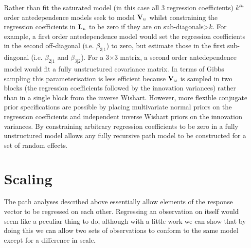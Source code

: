 \documentclass{article}
\begin{document}
Rather than fit the saturated model (in this case all 3 regression coefficients) $k^{th}$ order antedependence models seek to model ${\bf V}_{u}$ whilst constraining the regression coefficients in ${\bf L}_{u}$ to be zero if they are on sub-diagonals>$k$. For example, a first order antedependence model would set the regression coefficients in the second off-diagonal (i.e. $\beta_{3|1}$) to zero, but estimate those in the first sub-diagonal (i.e. $\beta_{2|1}$ and $\beta_{3|2}$). For a 3$\times$3 matrix, a second order antedependence model would fit a fully unstructured covariance matrix. In terms of Gibbs sampling this parameterisation is less efficient because ${\bf V}_{u}$ is sampled in two blocks (the regression coefficients followed by the innovation variances) rather than in a single block from the inverse Wishart. However, more flexible conjugate prior specifications are possible by placing multivariate normal priors on the regression coefficients and independent inverse Wishart priors on the innovation variances. By constraining arbitrary regression coefficients to be zero in a fully unstructured model allows any fully recursive path model to be constructed for a set of random effects.

\section{Scaling}

The path analyses described above essentially allow elements of the response vector to be regressed on each other. Regressing an observation on itself would seem like a peculiar thing to do, although with a little work we can show that by doing this we can allow two sets of observations to conform to the same model except for a difference in scale. 



\ifalone
\end{document}
